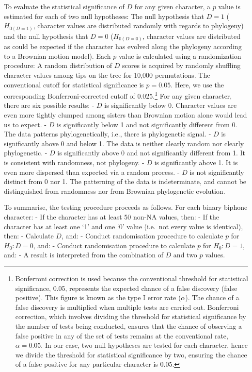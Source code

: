 To evaluate the statistical significance of \(D\) for any given character, a \(p\) value is estimated for each of two null hypotheses: The null hypothesis that \(D = 1\) (\(H_{0(D=1)}\), character values are distributed randomly with regards to phylogeny) and the null hypothesis that \(D = 0\) (\(H_{0(D=0)}\), character values are distributed as could be expected if the character has evolved along the phylogeny according to a Brownian motion model). Each \(p\) value is calculated using a randomization procedure: A random distribution of \(D\) scores is acquired by randomly shuffling character values among tips on the tree for 10,000 permutations. The conventional cutoff for statistical significance is \(p = 0.05\). Here, we use the corresponding Bonferroni-corrected cutoff of 0.025.\footnote{Bonferroni correction is used because the conventional threshold for statistical significance, 0.05, represents the expected chance of a false discovery (false positive). This figure is known as the type I error rate (\(\alpha\)). The chance of a false discovery is multiplied when multiple tests are carried out. Bonferroni correction, which involves dividing the threshold for statistical significance by the number of tests being conducted, ensures that the chance of observing a false positive in any of the set of tests remains at the conventional rate, \(\alpha = 0.05\). In our case, two null hypotheses are tested for each character, hence we divide the threshold for statistical significance by two, ensuring the chance of a false positive for any particular character is 0.05.} For any given character, there are six possible results:
- \(D\) is significantly below 0. Character values are even more tightly clumped among sisters than Brownian motion alone would lead us to expect.
- \(D\) is significantly below 1 and not significantly different from 0. The data patterns phylogenetically, i.e., there is phylogenetic signal.
- \(D\) is significantly above 0 and below 1. The data is neither clearly random nor clearly phylogenetic.
- \(D\) is significantly above 0 and not significantly different from 1. It is consistent with randomness, not phylogeny.
- \(D\) is significantly above 1. It is even more dispersed than expected via a random process.
- \(D\) is not significantly distinct from 0 nor 1. The patterning of the data is indeterminate, and cannot be distinguished from randomness nor from Brownian phylogenetic evolution.

To summarise, the testing procedure proceeds as follows. For each binary biphone character:
- If the character has at least 50 non-NA values, then:
- If the character has at least one `1' and one `0' value (i.e.~not every value is identical), then:
- Calculate \(D\), and:
- Conduct randomisation procedure to calculate \(p\) for \(H_0: D = 0\), and:
- Conduct randomisation procedure to calculate \(p\) for \(H_0: D = 1\), and:
- A result is interpreted from the combination of \(D\) and two \(p\) values.

